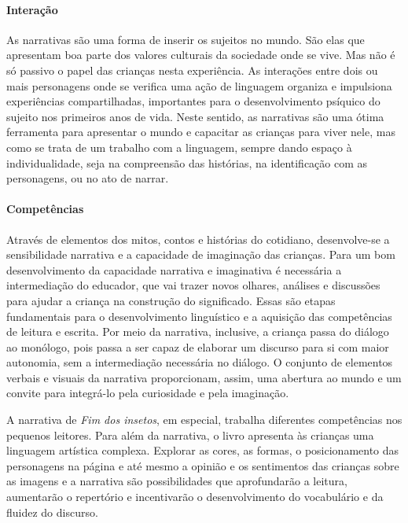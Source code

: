 \documentclass[11pt]{extarticle}
\begin{document}
\paragraph{Interação} 
As narrativas são uma forma de inserir os sujeitos no mundo. 
São elas que apresentam boa parte dos valores culturais da sociedade 
onde se vive. Mas não é só passivo o papel das crianças nesta experiência. 
As interações entre dois ou mais personagens onde se verifica
uma ação de linguagem organiza e impulsiona experiências compartilhadas,
importantes para o desenvolvimento psíquico do sujeito nos primeiros anos de vida.
Neste sentido, as narrativas são uma ótima ferramenta para
apresentar o mundo e capacitar as crianças para viver nele, mas como se
trata de um trabalho com a linguagem, sempre dando espaço à individualidade, 
seja na compreensão das histórias, na identificação com as personagens, ou 
no ato de narrar. 

\paragraph{Competências} 
Através de elementos dos mitos, contos e histórias do cotidiano, desenvolve-se a sensibilidade narrativa e a capacidade de imaginação das crianças. Para um bom desenvolvimento da capacidade narrativa e imaginativa é necessária a intermediação do educador, que vai trazer novos olhares, análises e discussões para ajudar a criança na construção do significado. Essas são etapas fundamentais para o desenvolvimento linguístico e a aquisição das competências de leitura e escrita. Por meio da narrativa, inclusive, a criança passa do diálogo ao monólogo, pois passa a ser capaz de elaborar um discurso para si com maior autonomia, sem a intermediação necessária no diálogo.
O conjunto de elementos verbais e visuais da narrativa proporcionam, assim,
uma abertura ao mundo e um convite para integrá-lo pela curiosidade e pela imaginação.


A narrativa de \textit{Fim dos insetos}, em especial, trabalha diferentes competências
nos pequenos leitores. Para além da narrativa, o livro apresenta às crianças uma linguagem artística complexa.
Explorar as cores, as formas, o posicionamento das personagens 
na página e até mesmo a opinião e os sentimentos das crianças sobre as imagens e a narrativa
são possibilidades que aprofundarão a leitura, aumentarão o repertório 
e incentivarão o desenvolvimento do vocabulário e da fluidez do discurso. 
\end{document}
